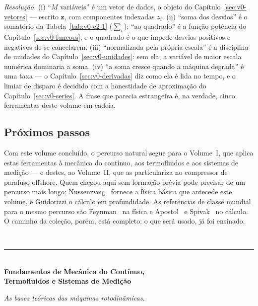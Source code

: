 \documentclass[12pt,a4paper]{article}
\numberwithin{equation}{section}
\numberwithin{table}{section}
\numberwithin{figure}{section}
\begin{document}
\emph{Resolução.} (i) ``$M$ variáveis'' é um vetor de dados, o objeto do
Capítulo~\ref{sec:v0-vetores} --- escrito $\bm{z}$, com componentes
indexadas $z_i$. (ii) ``soma dos desvios'' é o somatório da
Tabela~\ref{tab:v0-c2-1} ($\sum_i$); ``ao quadrado'' é a função potência
do Capítulo~\ref{sec:v0-funcoes}, e o quadrado é o que impede desvios
positivos e negativos de se cancelarem. (iii) ``normalizada pela própria
escala'' é a disciplina de unidades do Capítulo~\ref{sec:v0-unidades}:
sem ela, a variável de maior escala numérica dominaria a soma. (iv) ``a
soma cresce quando a máquina degrada'' é uma taxa --- o Capítulo~\ref{sec:v0-derivadas}
diz como ela é lida no tempo, e o limiar de disparo é decidido com a
honestidade de aproximação do Capítulo~\ref{sec:v0-series}. A frase que
parecia estrangeira é, na verdade, cinco ferramentas deste volume em
cadeia.

\subsection{Próximos passos}

Com este volume concluído, o percurso natural segue para o Volume~I, que
aplica estas ferramentas à mecânica do contínuo, aos termofluidos e aos
sistemas de medição --- e destes, ao Volume~II, que as particulariza no
compressor de parafuso offshore. Quem chegou aqui sem formação prévia
pode precisar de um percurso mais longo; Nussenzveig~\cite{nussenzveig}
fornece a física básica que antecede este volume, e Guidorizzi
\cite{guidorizzi2013} o cálculo em profundidade. As referências de classe
mundial para o mesmo percurso são Feynman~\cite{feynman1963} na física e
Apostol~\cite{apostol1967} e Spivak~\cite{spivak2008} no cálculo. O
caminho da coleção, porém, está completo: o que será usado, já foi
ensinado.



\clearpage

\clearpage

\newpage


\clearpage
\thispagestyle{empty}
{}
\vspace*{\fill}
\begin{center}
	{\color{capaBlue}\sffamily\bfseries\Large{}}\\[3mm]
	{\color{capaOuro}\rule{42mm}{2.2pt}}\\[9mm]
	{\huge\bfseries Fundamentos de Mecânica do Contínuo,\\Termofluidos e Sistemas de Medição}\\[7mm]
	\begin{minipage}{0.68\textwidth}
		\centering\itshape\small As bases teóricas das máquinas rotodinâmicas.
	\end{minipage}
\end{center}
\vspace*{\fill}
\clearpage
\end{document}

